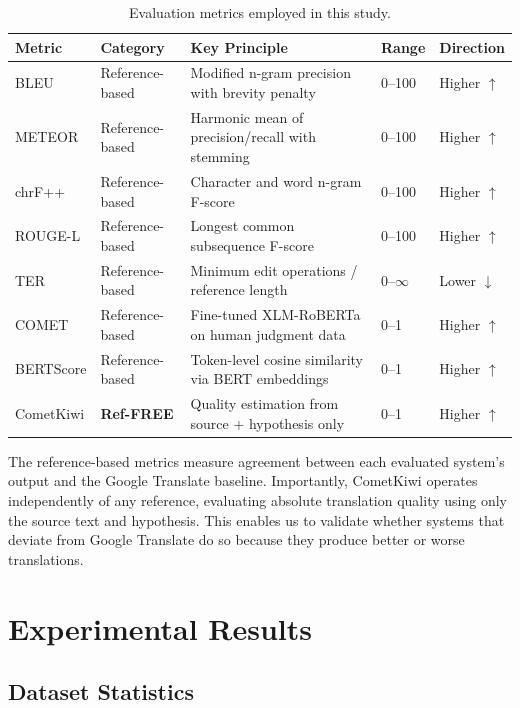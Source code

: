 \documentclass[Afour,sagev,times,doublespace]{sagej}
\begin{document}
\begin{table}[t]
\small\sf\centering
\caption{Evaluation metrics employed in this study.\label{tab:metrics}}
\begin{tabular}{@{}llp{5.5cm}ll@{}}
\toprule
Metric & Category & Key Principle & Range & Direction \\
\midrule
BLEU\cite{19} & Reference-based & Modified n-gram precision with brevity penalty & 0--100 & Higher $\uparrow$ \\
METEOR\cite{20} & Reference-based & Harmonic mean of precision/recall with stemming & 0--100 & Higher $\uparrow$ \\
chrF++\cite{21} & Reference-based & Character and word n-gram F-score & 0--100 & Higher $\uparrow$ \\
ROUGE-L\cite{22} & Reference-based & Longest common subsequence F-score & 0--100 & Higher $\uparrow$ \\
TER\cite{23} & Reference-based & Minimum edit operations / reference length & 0--$\infty$ & Lower $\downarrow$ \\
COMET\cite{24} & Reference-based & Fine-tuned XLM-RoBERTa on human judgment data & 0--1 & Higher $\uparrow$ \\
BERTScore\cite{25} & Reference-based & Token-level cosine similarity via BERT embeddings & 0--1 & Higher $\uparrow$ \\
\rowcolor{orange!15} CometKiwi\cite{27} & \textbf{Ref-FREE} & Quality estimation from source + hypothesis only & 0--1 & Higher $\uparrow$ \\
\bottomrule
\end{tabular}
\end{table}

The reference-based metrics measure agreement between each evaluated system's output and the Google Translate baseline. Importantly, CometKiwi operates independently of any reference, evaluating absolute translation quality using only the source text and hypothesis. This enables us to validate whether systems that deviate from Google Translate do so because they produce better or worse translations.

\section{Experimental Results}

\subsection{Dataset Statistics}
\end{document}
